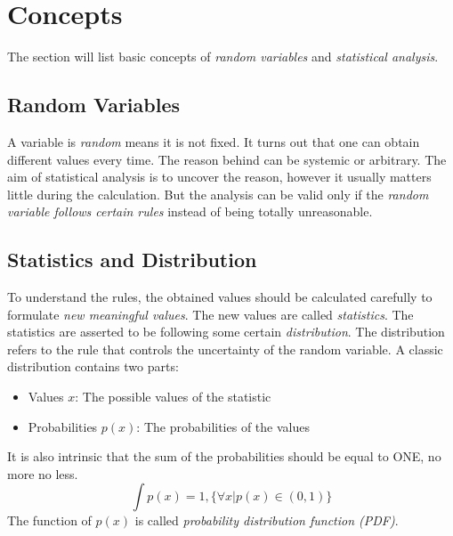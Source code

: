 \documentclass[../main.tex]{subfiles}
\begin{document}
\section{Concepts}
The section will list basic concepts of \emph{random variables} and \emph{statistical analysis}.

\subsection{Random Variables}
A variable is \emph{random} means it is not fixed.
It turns out that one can obtain different values every time.
The reason behind can be systemic or arbitrary.
The aim of statistical analysis is to uncover the reason, however it usually matters little during the calculation.
But the analysis can be valid only if the \emph{random variable follows certain rules} instead of being totally unreasonable.

\subsection{Statistics and Distribution}
To understand the rules, the obtained values should be calculated carefully to formulate \emph{new meaningful values}.
The new values are called \emph{statistics}.
The statistics are asserted to be following some certain \emph{distribution}.
The distribution refers to the rule that controls the uncertainty of the random variable.
A classic distribution contains two parts:
\begin{itemize}
    \item Values $x$: The possible values of the statistic
    \item Probabilities $p(x)$: The probabilities of the values
\end{itemize}
It is also intrinsic that the sum of the probabilities should be equal to ONE, no more no less.
\begin{equation*}
    \int p(x) = 1, \{ \forall x | p(x) \in (0, 1) \}
\end{equation*}
The function of $p(x)$ is called \emph{probability distribution function (PDF)}.
\end{document}
